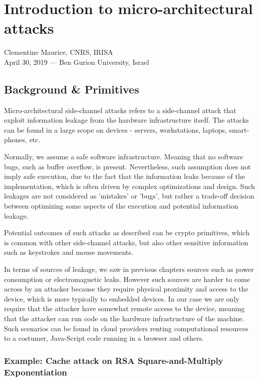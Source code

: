 \chapter{Introduction to micro-architectural attacks}
\label{chap:c7_cacheattacks}

Clementine Maurice, CNRS, IRISA\\
April 30, 2019 — Ben Gurion University, Israel

\section{Background \& Primitives} %
\label{sec:BackgroundnPrimitives}

Micro-architectural side-channel attacks refers to a side-channel attack that exploit information leakage from the hardware infrastructure itself. The attacks can be found in a large scope on devices - servers, workstations, laptops, smart-phones, etc.

Normally, we assume a safe software infrastructure. Meaning that no software bugs, such as buffer overflow, is present. Nevertheless, such assumption does not imply safe execution, due to the fact that the information leaks because of the implementation, which is often driven by complex optimizations and design. Such leakages are not considered as 'mistakes' or 'bugs', but rather a trade-off decision between optimizing some aspects of the execution and potential information leakage.    

Potential outcomes of such attacks as described can be crypto primitives, which is common with other side-channel attacks, but also other sensitive information such as keystrokes and mouse movements.  

In terms of sources of leakage, we saw in previous chapters sources such as power consumption or electromagnetic leaks. However such sources are harder to come across by an attacker because they require physical proximity and access to the device, which is more typically to embedded devices. In our case we are only require that the attacker have somewhat remote access to the device, meaning that the attacker can run code on the hardware infrastructure of the machine. Such scenarios can be found in cloud providers renting computational resources to a costumer, Java-Script code running in a browser and others.

\subsection{Example: Cache attack on RSA Square-and-Multiply Exponentiation}
\label{subsec:CacheattackonRSA}

